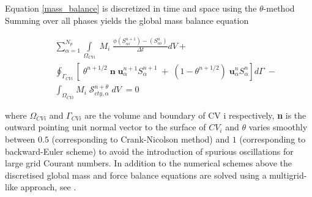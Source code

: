 \documentclass[preprint,authoryear,12pt]{elsarticle}
\begin{document}


Equation \ref{mass_balance} is discretized in time and space using the $\theta$-method %
Summing over all phases yields the global mass balance equation %

\begin{eqnarray}
 && \sum_{\alpha=1}^{N_{p}} \int\limits_{\Omega_{CVi}} \; M_{i} \; \frac{\phi\left(S_{\alpha i}^{n+1}\right)-\left(S_{\alpha i}^{n}\right)}{\Delta t} dV  + \nonumber\\
 &&  \oint_{\Gamma_{CVi}} [\; \theta^{n+1/2}\; {\mathbf n}\dot \; {\mathbf u}_{\alpha}^{n+1}S_{\alpha}^{n+1} \; + \; (1-\theta^{n+1/2}) \; {\mathbf u}_{\alpha}^{n}S_{\alpha}^{n}] d\Gamma \;- \nonumber\\
 &&  \int_{\Omega_{CVi}} M_{i} \; \mathcal{S}_{cty,\alpha}^{n+\theta} \; dV\; =0
\label{global_mass_balance}
\end{eqnarray}

\noindent where $\Omega_{CVi}$ and $\Gamma_{CVi}$ are the volume and boundary of CV i respectively, \textbf{n} is the outward pointing unit normal vector to the surface of $CV_{i}$ and $\theta$ varies smoothly between $0.5$ (corresponding to Crank-Nicolson method) and $1$ (corresponding to backward-Euler scheme) to avoid the introduction of spurious oscillations for large grid Courant numbers. In addition to the numerical schemes above the discretised global mass and force balance equations are solved using a multigrid-like approach, see \citet{pavlidis2016}.

\end{document}
